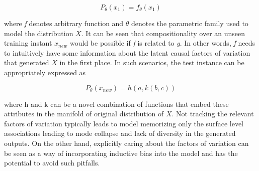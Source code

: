 \begin{equation}
P_{\theta}(x_1) = f_{\theta}(x_1)
\end{equation}

where \textit{f} denotes arbitrary function and $\theta$ denotes the parametric family used to model the distribution $X$. It can be seen that compositionality over an unseen training instant $x_{new}$ would be possible if \textit{f} is related to \textit{g}. In other words, \textit{f} needs to intuitively have some information about the latent causal factors of variation that generated $X$ in the first place. In such scenarios, the test instance can be appropriately expressed as 

\begin{equation}
P_{\theta}(x_{new}) = h(a,k(b,c))
\end{equation}

where h and k can be a novel combination of functions that embed these attributes in the manifold of original distribution of $X$. Not tracking the relevant factors of variation typically leads to model memorizing only the surface level associations leading to mode collapse and lack of diversity in the generated outputs. On the other hand, explicitly caring about the factors of variation can be seen as a way of incorporating inductive bias into the model and has the potential to avoid such pitfalls. 
 
\iffalse 

